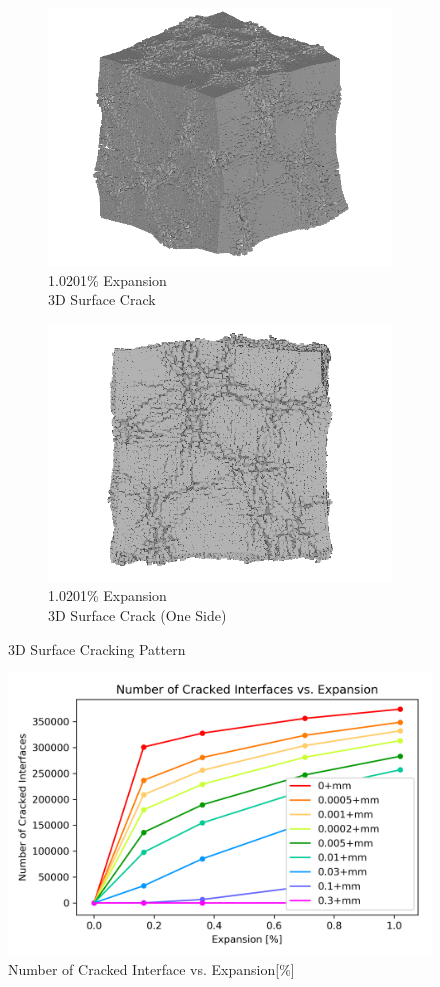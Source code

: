 \begin{figure}[ht!]
    \begin{subfigure}{.5\textwidth}
      \centering
      \includegraphics[width=0.5\linewidth]{Files/exp_3D/ASR/A30P25_4_3d.png}
      \caption{1.0201\% Expansion\\3D Surface Crack}
    \end{subfigure}%
    \begin{subfigure}{.5\textwidth}
      \centering
      \includegraphics[width=0.5\linewidth]{Files/exp_3D/ASR/A30P25_4_3ds.png}
      \caption{1.0201\% Expansion\\3D Surface Crack (One Side)}
    \end{subfigure}%

\caption{3D Surface Cracking Pattern}
\label{fig:A30_3Dcrack}
\end{figure}

\begin{figure}[ht!]
\centering
\includegraphics[width=.8\linewidth]{Files/interface/A30P25CRACK.png}
  \caption{Number of Cracked Interface vs. Expansion[\%]}
  \label{A30P25CRACK}
\end{figure}
